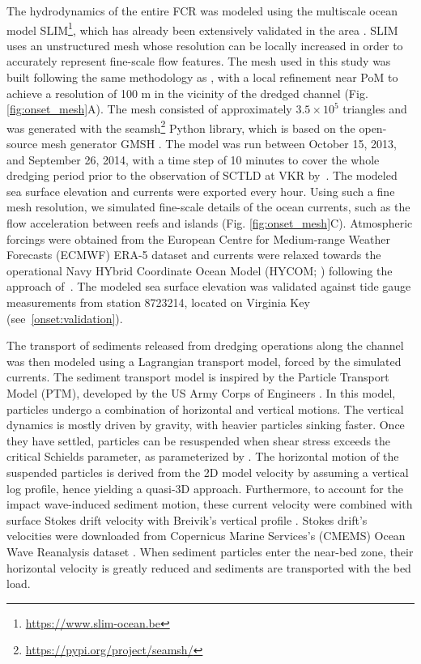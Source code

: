 \documentclass[preprint,12pt,authoryear]{elsarticle}
\begin{document}
The hydrodynamics of the entire FCR was modeled using the multiscale ocean model SLIM\footnote{\url{ https://www.slim-ocean.be}}, which has already been extensively validated in the area \citep{frys2020fine,dobbelaere2020coupled,dobbelaere2022impacts,dobbelaere2022connecting}. SLIM uses an unstructured mesh whose resolution can be locally increased in order to accurately represent fine-scale flow features. The mesh used in this study was built following the same methodology as \cite{dobbelaere2020coupled}, with a local refinement near PoM to achieve a resolution of 100 m in the vicinity of the dredged channel (Fig. \ref{fig:onset_mesh}A). The mesh consisted of approximately $3.5\times 10^5$ triangles and was generated with the seamsh\footnote{\url{https://pypi.org/project/seamsh/}} Python library, which is based on the open-source mesh generator GMSH \citep{geuzaine2009gmsh}. The model was run between October 15, 2013, and September 26, 2014, with a time step of 10 minutes to cover the whole dredging period prior to the observation of SCTLD at VKR by~\cite{precht2016unprecedented}. The modeled sea surface elevation and currents were exported every hour. Using such a fine mesh resolution, we simulated fine-scale details of the ocean currents, such as the flow acceleration between reefs and islands (Fig. \ref{fig:onset_mesh}C). Atmospheric forcings were obtained from the European Centre for Medium-range Weather Forecasts (ECMWF) ERA-5 dataset and currents were relaxed towards the operational Navy HYbrid Coordinate Ocean Model (HYCOM; \citealp{chassignet2007hycom}) following the approach of~\cite{dobbelaere2022impacts}. The modeled sea surface elevation was validated against tide gauge measurements from station 8723214, located on Virginia Key (see~\ref{onset:validation}).

The transport of sediments released from dredging operations along the channel was then modeled using a Lagrangian transport model, forced by the simulated currents. The sediment transport model is inspired by the Particle Transport Model (PTM), developed by the US Army Corps of Engineers \citep{macdonald2006ptm}. In this model, particles undergo a combination of horizontal and vertical motions. The vertical dynamics is mostly driven by gravity, with heavier particles sinking faster. Once they have settled, particles can be resuspended when shear stress exceeds   the critical Schields parameter, as parameterized by \cite{soulsby1997threshold}. The horizontal motion of the suspended particles is derived from the 2D model velocity by assuming a vertical log profile, hence yielding a quasi-3D approach. Furthermore, to account for the impact wave-induced sediment motion, these current velocity were combined with surface Stokes drift velocity with Breivik's vertical profile \citep{breivik2016stokes}. Stokes drift's velocities were downloaded from Copernicus Marine Services's (CMEMS) Ocean Wave Reanalysis dataset \citep{cmems}. When sediment particles enter the near-bed zone, their horizontal velocity is greatly reduced and sediments are transported with the bed load.   
\end{document}
